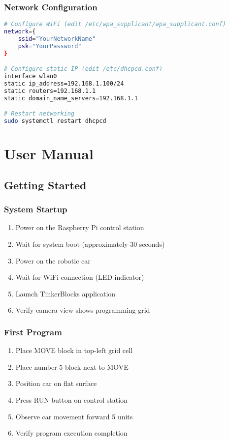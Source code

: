 \subsubsection{Network Configuration}

\begin{lstlisting}[language=bash,caption=Network Setup]
# Configure WiFi (edit /etc/wpa_supplicant/wpa_supplicant.conf)
network={
    ssid="YourNetworkName"
    psk="YourPassword"
}

# Configure static IP (edit /etc/dhcpcd.conf)
interface wlan0
static ip_address=192.168.1.100/24
static routers=192.168.1.1
static domain_name_servers=192.168.1.1

# Restart networking
sudo systemctl restart dhcpcd
\end{lstlisting}

\section{User Manual}

\subsection{Getting Started}

\subsubsection{System Startup}

\begin{enumerate}
    \item Power on the Raspberry Pi control station
    \item Wait for system boot (approximately 30 seconds)
    \item Power on the robotic car
    \item Wait for WiFi connection (LED indicator)
    \item Launch TinkerBlocks application
    \item Verify camera view shows programming grid
\end{enumerate}

\subsubsection{First Program}

\begin{enumerate}
    \item Place MOVE block in top-left grid cell
    \item Place number 5 block next to MOVE
    \item Position car on flat surface
    \item Press RUN button on control station
    \item Observe car movement forward 5 units
    \item Verify program execution completion
\end{enumerate}

